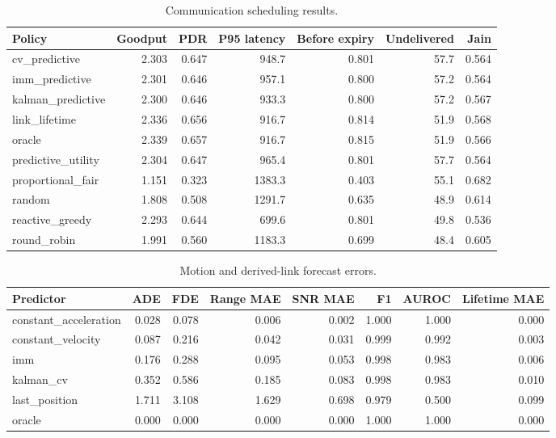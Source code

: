 \begin{table}[t]
\centering
\caption{Communication scheduling results.}
\begin{tabular}{lrrrrrr}
\toprule
Policy & Goodput & PDR & P95 latency & Before expiry & Undelivered & Jain \\
\midrule
cv\_predictive & 2.303 & 0.647 & 948.7 & 0.801 & 57.7 & 0.564 \\
imm\_predictive & 2.301 & 0.646 & 957.1 & 0.800 & 57.2 & 0.564 \\
kalman\_predictive & 2.300 & 0.646 & 933.3 & 0.800 & 57.2 & 0.567 \\
link\_lifetime & 2.336 & 0.656 & 916.7 & 0.814 & 51.9 & 0.568 \\
oracle & 2.339 & 0.657 & 916.7 & 0.815 & 51.9 & 0.566 \\
predictive\_utility & 2.304 & 0.647 & 965.4 & 0.801 & 57.7 & 0.564 \\
proportional\_fair & 1.151 & 0.323 & 1383.3 & 0.403 & 55.1 & 0.682 \\
random & 1.808 & 0.508 & 1291.7 & 0.635 & 48.9 & 0.614 \\
reactive\_greedy & 2.293 & 0.644 & 699.6 & 0.801 & 49.8 & 0.536 \\
round\_robin & 1.991 & 0.560 & 1183.3 & 0.699 & 48.4 & 0.605 \\
\bottomrule
\end{tabular}
\end{table}

\begin{table}[t]
\centering
\caption{Motion and derived-link forecast errors.}
\begin{tabular}{lrrrrrrr}
\toprule
Predictor & ADE & FDE & Range MAE & SNR MAE & F1 & AUROC & Lifetime MAE \\
\midrule
constant\_acceleration & 0.028 & 0.078 & 0.006 & 0.002 & 1.000 & 1.000 & 0.000 \\
constant\_velocity & 0.087 & 0.216 & 0.042 & 0.031 & 0.999 & 0.992 & 0.003 \\
imm & 0.176 & 0.288 & 0.095 & 0.053 & 0.998 & 0.983 & 0.006 \\
kalman\_cv & 0.352 & 0.586 & 0.185 & 0.083 & 0.998 & 0.983 & 0.010 \\
last\_position & 1.711 & 3.108 & 1.629 & 0.698 & 0.979 & 0.500 & 0.099 \\
oracle & 0.000 & 0.000 & 0.000 & 0.000 & 1.000 & 1.000 & 0.000 \\
\bottomrule
\end{tabular}
\end{table}

